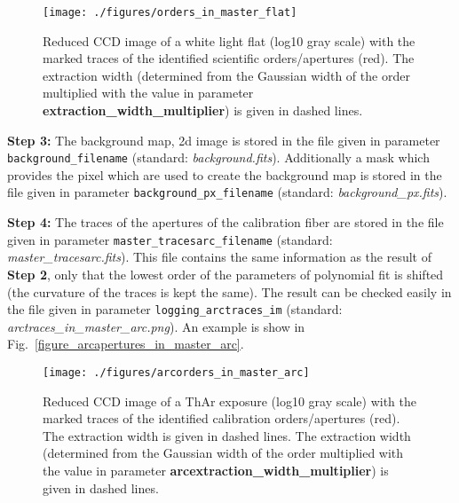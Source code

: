 \documentclass[10pt,a4paper]{article}
\begin{document}
\begin{figure} 
  \begin{center}
    \texttt{[image: ./figures/orders\_in\_master\_flat]}
  \end{center} 
  \caption{Reduced CCD image of a white light flat (log10 gray scale) with the marked traces of the identified scientific orders/apertures (red). The extraction width (determined from the Gaussian width of the order multiplied with the value in parameter \textbf{extraction\_width\_multiplier}) is given in dashed lines.
    \label{figure_apertures_in_master_flat}}
\end{figure}

\vspace{0.5em}\noindent \textbf{Step 3:} The background map, 2d image is stored in the file given in parameter \verb|background_filename| (standard: \textit{background.fits}). Additionally a mask which provides the pixel which are used to create the background map is stored in the file given in parameter \verb|background_px_filename| (standard: \textit{background\_px.fits}).

\vspace{0.5em}\noindent \textbf{Step 4:} The traces of the apertures of the calibration fiber are stored in the file given in parameter \verb|master_tracesarc_filename| (standard: \textit{master\_tracesarc.fits}). This file contains the same information as the result of \textbf{Step 2}, only that the lowest order of the parameters of polynomial fit is shifted (the curvature of the traces is kept the same). The result can be checked easily in the file given in parameter \verb|logging_arctraces_im| (standard: \textit{arctraces\_in\_master\_arc.png}). An example is show in Fig.~\ref{figure_arcapertures_in_master_arc}.

\begin{figure} 
  \begin{center}
    \texttt{[image: ./figures/arcorders\_in\_master\_arc]}
  \end{center} 
  \caption{Reduced CCD image of a ThAr exposure (log10 gray scale) with the marked traces of the identified calibration orders/apertures (red). The extraction width is given in dashed lines. The extraction width (determined from the Gaussian width of the order multiplied with the value in parameter \textbf{arcextraction\_width\_multiplier}) is given in dashed lines.
    \label{figure_arapertures_in_master_arc}}
\end{figure}
\end{document}
